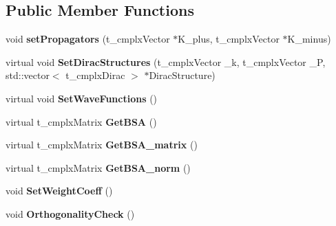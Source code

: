 \subsection*{Public Member Functions}
\begin{DoxyCompactItemize}
\item 
\hypertarget{class_c___b_s_e___hadron___base_ae90398cf83f468f5c7abda0f73d7b93a}{void {\bfseries set\-Propagators} (t\-\_\-cmplx\-Vector $\ast$K\-\_\-plus, t\-\_\-cmplx\-Vector $\ast$K\-\_\-minus)}\label{class_c___b_s_e___hadron___base_ae90398cf83f468f5c7abda0f73d7b93a}

\item 
\hypertarget{class_c___b_s_e___hadron___base_aa4f6a7802c962d980432254efeb1d432}{virtual void {\bfseries Set\-Dirac\-Structures} (t\-\_\-cmplx\-Vector \-\_\-k, t\-\_\-cmplx\-Vector \-\_\-\-P, std\-::vector$<$ t\-\_\-cmplx\-Dirac $>$ $\ast$Dirac\-Structure)}\label{class_c___b_s_e___hadron___base_aa4f6a7802c962d980432254efeb1d432}

\item 
\hypertarget{class_c___b_s_e___hadron___base_a8d1eac0e1cfc8abd52ef54389eebbf72}{virtual void {\bfseries Set\-Wave\-Functions} ()}\label{class_c___b_s_e___hadron___base_a8d1eac0e1cfc8abd52ef54389eebbf72}

\item 
\hypertarget{class_c___b_s_e___hadron___base_a8cfb0b4fe51a312ad7232bd0fa4c1ccf}{virtual t\-\_\-cmplx\-Matrix {\bfseries Get\-B\-S\-A} ()}\label{class_c___b_s_e___hadron___base_a8cfb0b4fe51a312ad7232bd0fa4c1ccf}

\item 
\hypertarget{class_c___b_s_e___hadron___base_ac42953ea725bd1bd160453e1a11b266f}{virtual t\-\_\-cmplx\-Matrix {\bfseries Get\-B\-S\-A\-\_\-matrix} ()}\label{class_c___b_s_e___hadron___base_ac42953ea725bd1bd160453e1a11b266f}

\item 
\hypertarget{class_c___b_s_e___hadron___base_ae8c77c16c9e4f23b099f107090884c13}{virtual t\-\_\-cmplx\-Matrix {\bfseries Get\-B\-S\-A\-\_\-norm} ()}\label{class_c___b_s_e___hadron___base_ae8c77c16c9e4f23b099f107090884c13}

\item 
\hypertarget{class_c___b_s_e___hadron___base_adaa26ee0f5395d52d38caa9f0d1dcd2e}{void {\bfseries Set\-Weight\-Coeff} ()}\label{class_c___b_s_e___hadron___base_adaa26ee0f5395d52d38caa9f0d1dcd2e}

\item 
\hypertarget{class_c___b_s_e___hadron___base_a8764b865efa5b38ee718e846f5b4141e}{void {\bfseries Orthogonality\-Check} ()}\label{class_c___b_s_e___hadron___base_a8764b865efa5b38ee718e846f5b4141e}


\end{DoxyCompactItemize}
